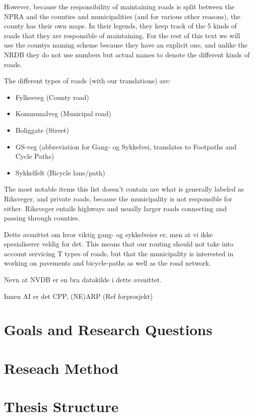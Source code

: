 However, because the responsibility of maintaining roads is split between the NPRA and the counties and municipalities (and for various other reasons), the county has their own maps. In their legends, they keep track of the 5 kinds of roads that they are responsible of maintaining. For the rest of this text we will use the countys naming scheme because they have an explicit one, and unlike the NRDB they do not use numbers but actual names to denote the different kinds of roads.

The different types of roads (with our translations) are:
\begin{itemize}
	\item Fylkesveg (County road)
	\item Kommunalveg (Municipal road)
	\item Boliggate (Street)
	\item GS-veg (abbreviation for Gang- og Sykkelvei, translates to Footpaths and Cycle Paths) %
	\item Sykkelfelt (Bicycle lane/path)
\end{itemize}

The most notable items this list doesn't contain are what is generally labeled as Riksveger, and private roads, because the municipality is not responsible for either. Riksveger entails highways and usually larger roads connecting and passing through counties.

Dette avsnittet om hvor viktig gang- og sykkelveier er, men at vi ikke spesialiserer veldig for det. This means that our routing should not take into account servicing T types of roads, but that the municipality is interested in working on pavements and bicycle-paths as well as the road network.

Nevn at NVDB er en bra datakilde i dette avsnittet.

Innen AI er det CPP, (NE)ARP (Ref forprosjekt)

\section{Goals and Research Questions}

\section{Reseach Method}

\section{Thesis Structure}



\cleardoublepage
